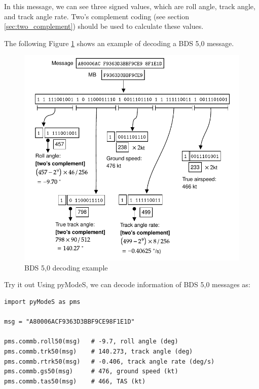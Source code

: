 In this message, we can see three signed values, which are roll angle, track angle, and track angle rate. Two's complement coding (see section \ref{sec:two_complement}) should be used to calculate these values. 

The following Figure \ref{fig:bds50_example} shows an example of decoding a BDS 5,0 message.

\begin{figure}[ht]
  \centering
  \includegraphics[scale=0.9]{figures/mode_s/bds50_example.pdf}
  \caption{BDS 5,0 decoding example}
  \label{fig:bds50_example}
\end{figure}

\begin{notebox}{Try it out}
Using pyModeS, we can decode information of BDS 5,0 messages as: 

\begin{verbatim}
import pyModeS as pms

msg = "A80006ACF9363D3BBF9CE98F1E1D"

pms.commb.roll50(msg)   # -9.7, roll angle (deg)
pms.commb.trk50(msg)    # 140.273, track angle (deg)
pms.commb.rtrk50(msg)   # -0.406, track angle rate (deg/s)
pms.commb.gs50(msg)     # 476, ground speed (kt)
pms.commb.tas50(msg)    # 466, TAS (kt)

\end{verbatim}

\end{notebox}


